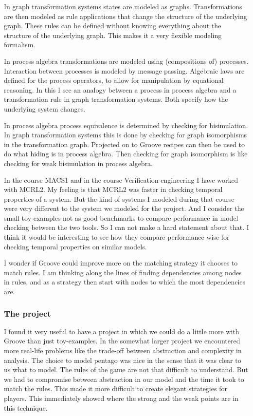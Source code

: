 In graph transformation systems states are modeled as graphs. Transformations are then modeled as rule applications that change the structure of the underlying graph. These rules can be defined without knowing everything about the structure of the underlying graph.
This makes it a very flexible modeling formalism. 

In process algebra transformations are modeled using (compositions of) processes. Interaction between processes is modeled by message passing. Algebraic laws are defined for the process operators, to allow for manipulation by equational reasoning.
In this I see an analogy between a process in process algebra and a transformation rule in graph transformation systems. Both specify how the underlying system changes. 

In process algebra process equivalence is determined by checking for bisimulation. In graph transformation systems this is done by checking for graph isomorphisms in the transformation graph.
Projected on to Groove recipes can then be used to do what hiding is in process algebra. Then checking for graph isomorphism is like checking for weak bisimulation in process algebra.

In the course MACS1 and in the course Verification engineering I have worked with MCRL2.
My feeling is that MCRL2 was faster in checking temporal properties of a system.
But the kind of systems I modeled during that course were very different to the system we modeled for the project. 
And I consider the small toy-examples not as good benchmarks to compare performance in model checking between the two tools.
So I can not make a hard statement about that.
I think it would be interesting to see how they compare performance wise for checking temporal properties on similar models.

I wonder if Groove could improve more on the matching strategy it chooses to match rules. 
I am thinking along the lines of finding dependencies among nodes in rules, and as a strategy then start with nodes to which the most dependencies are.

\subsubsection{The project}

I found it very useful to have a project in which we could do a little more with Groove than just toy-examples. 
In the somewhat larger project we encountered more real-life problems like the trade-off between abstraction and complexity in analysis.
The choice to model pentago was nice in the sense that it was clear to us what to model. The rules of the game are not that difficult to understand.
But we had to compromise between abstraction in our model and the time it took to match the rules. This made it more difficult to create elegant strategies for players.
This immediately showed where the strong and the weak points are in this technique.

